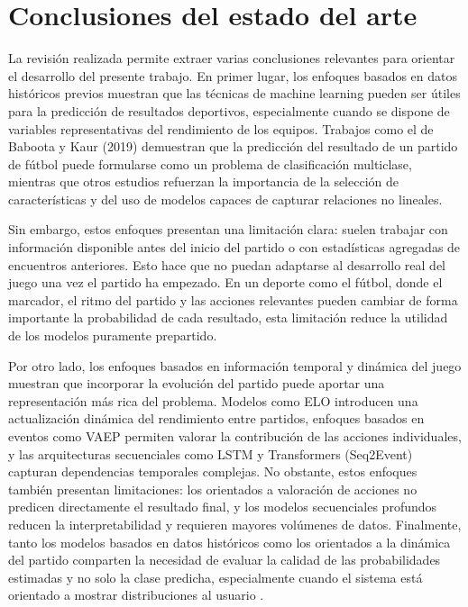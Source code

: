 \section{Conclusiones del estado del arte}

La revisión realizada permite extraer varias conclusiones relevantes para orientar el desarrollo del presente trabajo. En primer lugar, los enfoques basados en datos históricos previos muestran que las técnicas de machine learning pueden ser útiles para la predicción de resultados deportivos, especialmente cuando se dispone de variables representativas del rendimiento de los equipos. Trabajos como el de Baboota y Kaur (2019) demuestran que la predicción del resultado de un partido de fútbol puede formularse como un problema de clasificación multiclase, mientras que otros estudios refuerzan la importancia de la selección de características y del uso de modelos capaces de capturar relaciones no lineales.

Sin embargo, estos enfoques presentan una limitación clara: suelen trabajar con información disponible antes del inicio del partido o con estadísticas agregadas de encuentros anteriores. Esto hace que no puedan adaptarse al desarrollo real del juego una vez el partido ha empezado. En un deporte como el fútbol, donde el marcador, el ritmo del partido y las acciones relevantes pueden cambiar de forma importante la probabilidad de cada resultado, esta limitación reduce la utilidad de los modelos puramente prepartido.

Por otro lado, los enfoques basados en información temporal y dinámica del juego muestran que incorporar la evolución del partido puede aportar una representación más rica del problema. Modelos como ELO introducen una actualización dinámica del rendimiento entre partidos, enfoques basados en eventos como VAEP permiten valorar la contribución de las acciones individuales, y las arquitecturas secuenciales como LSTM y Transformers (Seq2Event) capturan dependencias temporales complejas. No obstante, estos enfoques también presentan limitaciones: los orientados a valoración de acciones no predicen directamente el resultado final, y los modelos secuenciales profundos reducen la interpretabilidad y requieren mayores volúmenes de datos. Finalmente, tanto los modelos basados en datos históricos como los orientados a la dinámica del partido comparten la necesidad de evaluar la calidad de las probabilidades estimadas y no solo la clase predicha, especialmente cuando el sistema está orientado a mostrar distribuciones al usuario \citep{walsh2024calibration}.

